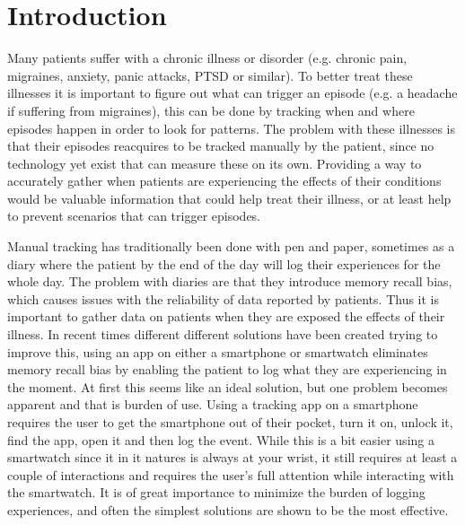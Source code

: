 \chapter{Introduction}

Many patients suffer with a chronic illness or disorder (e.g. chronic pain, migraines, anxiety, panic attacks, PTSD or similar). To better treat these illnesses it is important to figure out what can trigger an episode (e.g. a headache if suffering from migraines), this can be done by tracking when and where episodes happen in order to look for patterns. The problem with these illnesses is that their episodes reacquires to be tracked manually by the patient, since no technology yet exist that can measure these on its own. Providing a way to accurately gather when patients are experiencing the effects of their conditions would be valuable information that could help treat their illness, or at least help to prevent scenarios that can trigger episodes. 

Manual tracking has traditionally been done with pen and paper, sometimes as a diary where the patient by the end of the day will log their experiences for the whole day. The problem with diaries are that they introduce memory recall bias, which causes issues with the reliability of data reported by patients. Thus it is important to gather data on patients when they are exposed the effects of their illness. In recent times different different solutions have been created trying to improve this, using an app on either a smartphone or smartwatch eliminates memory recall bias by enabling the patient to log what they are experiencing in the moment. At first this seems like an ideal solution, but one problem becomes apparent and that is burden of use. Using a tracking app on a smartphone requires the user to get the smartphone out of their pocket, turn it on, unlock it, find the app, open it and then log the event. While this is a bit easier using a smartwatch since it in it natures is always at your wrist, it still requires at least a couple of interactions and requires the user's full attention while interacting with the smartwatch. It is of great importance to minimize the burden of logging experiences, and often the simplest solutions are shown to be the most effective.

